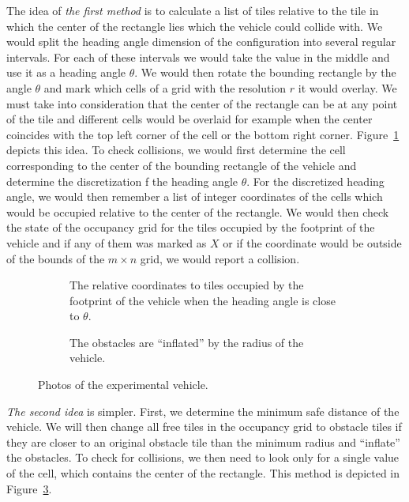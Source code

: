 The idea of \textit{the first method} is to calculate a list of tiles relative to the tile in which the center of the rectangle lies which the vehicle could collide with. We would split the heading angle dimension of the configuration into several regular intervals. For each of these intervals we would take the value in the middle and use it as a heading angle $\theta$. We would then rotate the bounding rectangle by the angle $\theta$ and mark which cells of a grid with the resolution $r$ it would overlay. We must take into consideration that the center of the rectangle can be at any point of the tile and different cells would be overlaid for example when the center coincides with the top left corner of the cell or the bottom right corner. Figure~\ref{fig:collision_detection_overlap} depicts this idea. To check collisions, we would first determine the cell corresponding to the center of the bounding rectangle of the vehicle and determine the discretization f the heading angle $\theta$. For the discretized heading angle, we would then remember a list of integer coordinates of the cells which would be occupied relative to the center of the rectangle. We would then check the state of the occupancy grid for the tiles occupied by the footprint of the vehicle and if any of them was marked as $X$ or if the coordinate would be outside of the bounds of the $m\times n$ grid, we would report a collision.

\begin{figure}[!tbp]%
	\centering
	\begin{subfigure}[t]{0.45\textwidth}
		\label{fig:collision_detection_overlap}
		\caption{The relative coordinates to tiles occupied by the footprint of the vehicle when the heading angle is close to $\theta$.}
	\end{subfigure}
	\hfill
	\begin{subfigure}[t]{0.45\textwidth}
		\label{fig:collision_detection_inflation}
		\caption{The obstacles are ``inflated'' by the radius of the vehicle.}
	\end{subfigure}
	
	\caption{Photos of the experimental vehicle.}
\end{figure}

\textit{The second idea} is simpler. First, we determine the minimum safe distance of the vehicle. We will then change all free tiles in the occupancy grid to obstacle tiles if they are closer to an original obstacle tile than the minimum radius and ``inflate'' the obstacles. To check for collisions, we then need to look only for a single value of the cell, which contains the center of the rectangle. This method is depicted in Figure~\ref{fig:collision_detection_inflation}.


